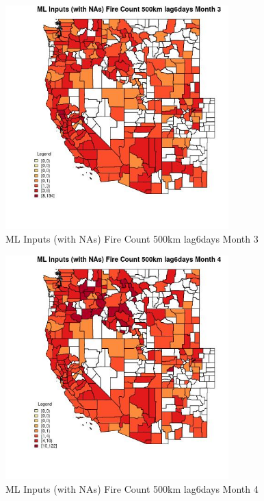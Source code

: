 \begin{figure} 
\centering  
\includegraphics[width=0.77\textwidth]{Code_Outputs/Report_ML_input_PM25_Step4_part_e_de_duplicated_aves_compiled_2019-05-21wNAs_CountyFire_Count_500km_lag6daysmedianMonth3.jpg} 
\caption{\label{fig:Report_ML_input_PM25_Step4_part_e_de_duplicated_aves_compiled_2019-05-21wNAsCountyFire_Count_500km_lag6daysmedianMonth3}ML Inputs (with NAs) Fire Count 500km lag6days Month 3} 
\end{figure} 
 

\begin{figure} 
\centering  
\includegraphics[width=0.77\textwidth]{Code_Outputs/Report_ML_input_PM25_Step4_part_e_de_duplicated_aves_compiled_2019-05-21wNAs_CountyFire_Count_500km_lag6daysmedianMonth4.jpg} 
\caption{\label{fig:Report_ML_input_PM25_Step4_part_e_de_duplicated_aves_compiled_2019-05-21wNAsCountyFire_Count_500km_lag6daysmedianMonth4}ML Inputs (with NAs) Fire Count 500km lag6days Month 4} 
\end{figure} 
 

